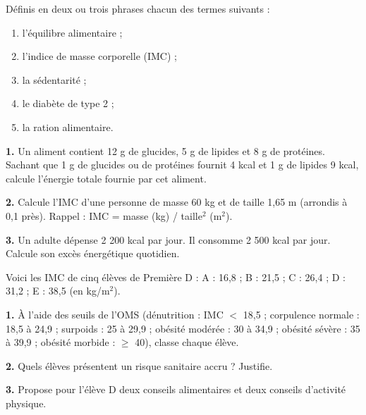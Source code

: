 \documentclass[11pt]{article}
\newcounter{popsec}
\newcounter{popsub}
\newcommand{\courssub}[1]{%
  \stepcounter{popsub}%
  \par\vspace{9pt}\noindent{\popxbold\fontsize{11.5}{13}\selectfont\color{popink}{\color{poporange}\thepopsec.\thepopsub}\hspace{6pt}#1}\par\nopagebreak\vspace{4pt}
}
\begin{document}
\begin{exercice}
Définis en deux ou trois phrases chacun des termes suivants :
\begin{enumerate}
\item l'équilibre alimentaire ;
\item l'indice de masse corporelle (IMC) ;
\item la sédentarité ;
\item le diabète de type 2 ;
\item la ration alimentaire.
\end{enumerate}
\end{exercice}

\begin{exercice}
\textbf{1.} Un aliment contient 12 g de glucides, 5 g de lipides et 8 g de protéines. Sachant que 1 g de glucides ou de protéines fournit 4 kcal et 1 g de lipides 9 kcal, calcule l'énergie totale fournie par cet aliment.

\textbf{2.} Calcule l'IMC d'une personne de masse 60 kg et de taille 1,65 m (arrondis à 0,1 près). Rappel : IMC = masse (kg) / taille$^2$ (m$^2$).

\textbf{3.} Un adulte dépense 2 200 kcal par jour. Il consomme 2 500 kcal par jour. Calcule son excès énergétique quotidien.
\end{exercice}

\courssub{Je m'entraîne}

\begin{exercice}
Voici les IMC de cinq élèves de Première D : A : 16,8 ; B : 21,5 ; C : 26,4 ; D : 31,2 ; E : 38,5 (en kg/m$^2$).

\textbf{1.} À l'aide des seuils de l'OMS (dénutrition : IMC $<$ 18,5 ; corpulence normale : 18,5 à 24,9 ; surpoids : 25 à 29,9 ; obésité modérée : 30 à 34,9 ; obésité sévère : 35 à 39,9 ; obésité morbide : $\geq$ 40), classe chaque élève.

\textbf{2.} Quels élèves présentent un risque sanitaire accru ? Justifie.

\textbf{3.} Propose pour l'élève D deux conseils alimentaires et deux conseils d'activité physique.
\end{exercice}
\end{document}
